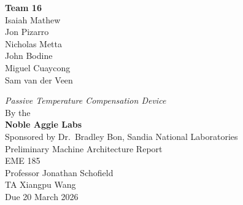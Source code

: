 \documentclass[12pt, letterpaper]{report}%
\newcounter{mycounter}           %
\newcounter{sub}[mycounter]      %
\newcommand{\projecttitle}{Passive Temperature Compensation Device}
\newcommand{\teamname}{Noble Aggie Labs}
\newcommand{\teamnumber}{16}
\newcommand{\sponsor}{Dr.\ Bradley Bon}
\newcommand{\organization}{Sandia National Laboratories}
\newcommand{\coursename}{EME 185}
\newcommand{\instructor}{Professor Jonathan Schofield}
\newcommand{\ta}{Xiangpu Wang}
\newcommand{\duedate}{20 March 2026}
\begin{document}
\newpage
\thispagestyle{empty}  %

\vspace*{1in}
\begin{center}
    {\Large\bfseries Team \teamnumber}\\[24pt]

    {\large
        Isaiah Mathew\\[8pt]
        Jon Pizarro\\[8pt]
        Nicholas Metta\\[8pt]
        John Bodine\\[8pt]
        Miguel Cuaycong\\[8pt]
        Sam van der Veen\\[8pt]
    }

    \vspace{0.6in}

    {\Large\itshape \projecttitle}\\[12pt]
    {\large By the}\\[12pt]
    {\Large\bfseries \teamname}\\[24pt]
    {\large Sponsored by \sponsor, \organization}\\[36pt]
    {\large Preliminary Machine Architecture Report}\\[12pt]
    {\large \coursename}\\[6pt]
    {\large \instructor}\\[6pt]
    {\large TA \ta}\\[12pt]
    {\large Due \duedate}
\end{center}


%
\end{document}
